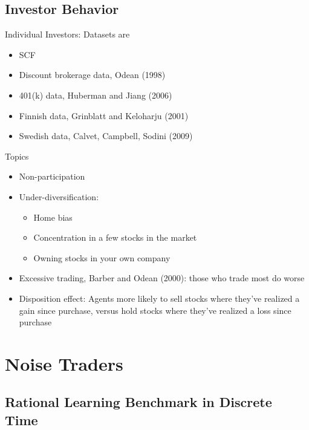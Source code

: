 \documentclass[12pt]{article}
\theoremstyle{plain}
\theoremstyle{definition}
\theoremstyle{remark}
\begin{document}
\subsection{Investor Behavior}


Individual Investors:
Datasets are
\begin{itemize}
  \item SCF
  \item Discount brokerage data, Odean (1998)
  \item 401(k) data, Huberman and Jiang (2006)
  \item Finnish data, Grinblatt and Keloharju (2001)
  \item Swedish data, Calvet, Campbell, Sodini (2009)
\end{itemize}
Topics
\begin{itemize}
  \item Non-participation
  \item Under-diversification:
    \begin{itemize}
      \item Home bias
      \item Concentration in a few stocks in the market
      \item Owning stocks in your own company
    \end{itemize}
  \item Excessive trading, Barber and Odean (2000): those who trade most
    do worse
  \item Disposition effect: Agents more likely to sell stocks where
    they've realized a gain since purchase, versus hold stocks where
    they've realized a loss since purchase
\end{itemize}


\clearpage
\section{Noise Traders}

\subsection{Rational Learning Benchmark in Discrete Time}
\end{document}
